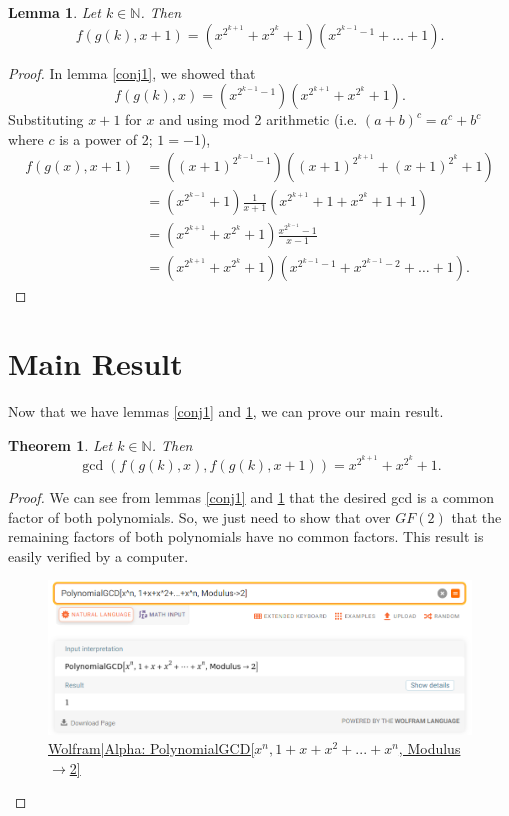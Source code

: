 \documentclass{article}
\newtheorem{lemma}{Lemma}
\newtheorem{theorem}{Theorem}
\newcommand{\N}{\mathbb{N}}
\begin{document}
	\begin{lemma}
		\label{conj2}
		Let $k \in \N$.
		Then
		\begin{equation*}
			f(g(k), x+1) = \left(x^{2^{k+1}}+x^{2^k}+1\right)\left(x^{2^{k-1}-1}+\dots+1\right).
		\end{equation*}
	\end{lemma}
	\begin{proof}
		In lemma \ref{conj1}, we showed that
		\begin{equation*}
			f(g(k),x) = \left(x^{2^{k-1}-1}\right)\left(x^{2^{k+1}} + x^{2^{k}} + 1\right).
		\end{equation*}
		Substituting $x+1$ for $x$ and using mod 2 arithmetic (i.e. $(a+b)^c = a^c + b^c$ where $c$ is a power of 2; $1 = -1$),
		\begin{align*}
			f(g(x), x+1) &= \left((x+1)^{2^{k-1}-1}\right)\left((x+1)^{2^{k+1}} + (x+1)^{2^k} + 1\right) \\
			&= \left(x^{2^{k-1}}+1\right)\frac{1}{x+1}\left(x^{2^{k+1}} + 1 + x^{2^k} + 1 + 1\right) \\
			&= \left(x^{2^{k+1}} + x^{2^k} + 1\right)\frac{x^{2^{k-1}}-1}{x-1} \\
			&= \left(x^{2^{k+1}} + x^{2^k} + 1\right)\left(x^{2^{k-1}-1} + x^{2^{k-1}-2} + \dots + 1\right).
		\end{align*}
	\end{proof}
	
	\section{Main Result}
	Now that we have lemmas \ref{conj1} and \ref{conj2}, we can prove our main result.
	\begin{theorem}
		Let $k \in \N$.
		Then
		\begin{equation*}
			\gcd\left(f(g(k),x),f(g(k),x+1)\right) = x^{2^{k+1}} + x^{2^k} + 1.
		\end{equation*}
	\end{theorem}
	\begin{proof}
		We can see from lemmas 
		\ref{conj1} and \ref{conj2} that the desired gcd is a common factor of both polynomials.
		So, we just need to show that over $GF(2)$ that the remaining factors of both polynomials have no common factors.
		This result is easily verified by a computer.
		
		\begin{figure}[H]
			\centering
			\includegraphics[width=.8\textwidth]{wolfram_result.png}
			\caption{\href{https://www.wolframalpha.com/input/?i=PolynomialGCD\%5Bx\%5En\%2C+1\%2Bx\%2Bx\%5E2\%2B...\%2Bx\%5En\%2C+Modulus-\%3E2\%5D}{Wolfram|Alpha: PolynomialGCD[$x^n, 1+x+x^2+...+x^n$, Modulus$\to$2]}}
		\end{figure}
	\end{proof}
\end{document}
